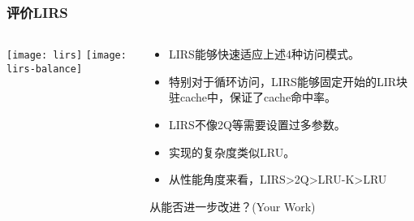 \begin{frame}[plain]
	\frametitle{评价LIRS}
	\begin{columns}
		\begin{column}{.3\textwidth}
			\centering
			\texttt{[image: lirs]}
			\texttt{[image: lirs-balance]}
		\end{column}
		
		\begin{column}{.6\textwidth}
			
				\begin{itemize}
					\item LIRS能够快速适应上述4种访问模式。
					\item 特别对于循环访问，LIRS能够固定开始的LIR块驻cache中，保证了cache命中率。
					\item LIRS不像2Q等需要设置过多参数。
					\item 实现的复杂度类似LRU。
					\item  从性能角度来看，LIRS>2Q>LRU-K>LRU
					
				\end{itemize}
			\centering
			\large 从能否进一步改进？(Your Work)
			
		\end{column}
		
		
	\end{columns}
\end{frame}



